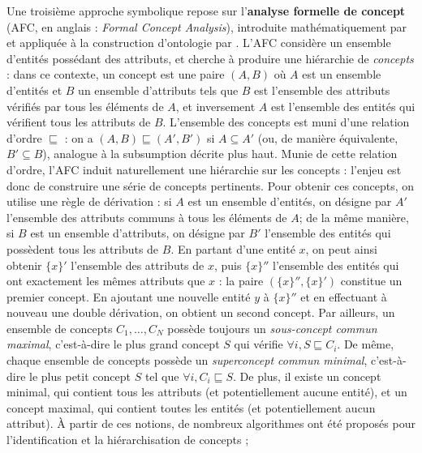 Une troisième approche symbolique repose sur l'\textbf{analyse formelle de concept} (AFC, en anglais :  \textit{Formal Concept Analysis}), introduite mathématiquement par \cite{wille1982fca} et appliquée à la construction d'ontologie par \cite{cimiano2004conceptual}. L'AFC considère un ensemble d'entités possédant des attributs, et cherche à produire une hiérarchie de \textit{concepts} : dans ce contexte, un concept est une paire $(A, B)$ où $A$ est un ensemble d'entités et $B$ un ensemble d'attributs tels que $B$ est l'ensemble des attributs vérifiés par tous les éléments de $A$, et inversement $A$ est l'ensemble des entités qui vérifient tous les attributs de $B$. L'ensemble des concepts est muni d'une relation d'ordre $\sqsubseteq$ : on a $(A, B) \sqsubseteq (A', B')$ si $A \subseteq A'$ (ou, de manière équivalente, $B' \subseteq B$), analogue à la subsumption décrite plus haut. Munie de cette relation d'ordre, l'AFC induit naturellement une hiérarchie sur les concepts : l'enjeu est donc de construire une série de concepts pertinents.
Pour obtenir ces concepts, on utilise une règle de dérivation : si $A$ est un ensemble d'entités, on désigne par $A'$ l'ensemble des attributs communs à tous les éléments de $A$; de la même manière, si $B$ est un ensemble d'attributs, on désigne par $B'$ l'ensemble des entités qui possèdent tous les attributs de $B$. En partant d'une entité $x$, on peut ainsi obtenir $\{x\}'$ l'ensemble des attributs de $x$, puis $\{x\}''$ l'ensemble des entités qui ont exactement les mêmes attributs que $x$ : la paire $(\{x\}'', \{x\}' )$ constitue un premier concept. En ajoutant une nouvelle entité $y$ à $\{x\}''$ et en effectuant à nouveau une double dérivation, on obtient un second concept. Par ailleurs, un ensemble de concepts $C_1, \ldots, C_N$ possède toujours un \textit{sous-concept commun maximal}, c'est-à-dire le plus grand concept $S$ qui vérifie $\forall i, S \sqsubseteq C_i$. De même, chaque ensemble de concepts possède un \textit{superconcept commun minimal}, c'est-à-dire le plus petit concept $S$ tel que $\forall i, C_i \sqsubseteq S$. De plus, il existe un concept minimal, qui contient tous les attributs (et potentiellement aucune entité), et un concept maximal, qui contient toutes les entités (et potentiellement aucun attribut). 
À partir de ces notions, de nombreux algorithmes ont été proposés pour l'identification et la hiérarchisation de concepts \cite{valtchev2001building, nourine1999fast, farach2008linear}; 
